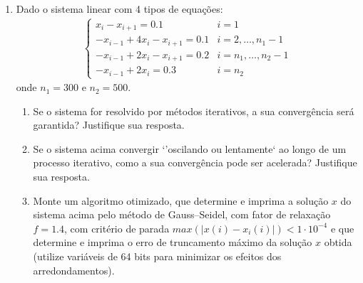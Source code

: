 \documentclass[12pt]{article}
\newenvironment{smallitem}{
    \vspace{-2mm}
    \begin{enumerate}
    \setlength{\parskip}{0pt}
    \setlength{\itemsep}{2pt}
}{
    \vspace{-2mm}
    \end{enumerate}
}
\begin{document}
\begin{enumerate}[label=\textbf{\arabic*})]
\item  Dado o sistema linear com 4 tipos de equações:
\begin{align*}
\begin{cases}
x_i - x_{i + 1} = 0.1 & i = 1 \\
- x_{i - 1} + 4x_i - x_{i + 1} = 0.1 & i = 2, \dots, n_1 - 1 \\
- x_{i - 1} + 2x_i - x_{i + 1} = 0.2 & i = n_1, \dots, n_2 - 1 \\
- x_{i - 1} + 2x_i = 0.3 & i = n_2
\end{cases}
\end{align*}
onde $n_1 = 300$ e $n_2 = 500$.

\begin{smallitem}

\item Se o sistema for resolvido por métodos iterativos, a sua convergência
será garantida? Justifique sua resposta.

\item Se o sistema acima convergir `'oscilando ou lentamente` ao longo de um
processo iterativo, como a sua convergência pode ser acelerada? Justifique sua
resposta.

\item Monte um algoritmo otimizado, que determine e imprima a solução $x$ do
sistema acima pelo método de Gauss--Seidel, com fator de relaxação $f = 1.4$,
com critério de parada $max(\vert x(i) - x_i(i) \vert) < 1 \cdot 10^{-4}$ e
que determine e imprima o erro de truncamento máximo da solução $x$ obtida
(utilize variáveis de 64 bits para minimizar os efeitos dos arredondamentos).

\end{smallitem}

\end{enumerate}
\end{document}
